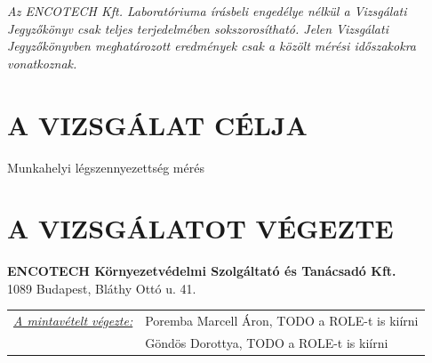 \documentclass[a4paper,12pt]{article}
\begin{document}
	\begin{center}
		{\scriptsize 
			\textit{
				Az ENCOTECH Kft. Laboratóriuma írásbeli engedélye nélkül a Vizsgálati Jegyzőkönyv csak teljes terjedelmében sokszorosítható. 
				Jelen Vizsgálati Jegyzőkönyvben meghatározott eredmények csak a közölt mérési időszakokra vonatkoznak.
		}}  
	\end{center}
	
	\newpage
	

	\tableofcontents
	

	\newpage  %
	\pagestyle{report}
	
	
	\section{A VIZSGÁLAT CÉLJA}
		\begin{adjustwidth}{1cm}{0cm}
		Munkahelyi légszennyezettség mérés
		\end{adjustwidth}
	
	
	\section{A VIZSGÁLATOT VÉGEZTE}
		\begin{adjustwidth}{1cm}{0cm}
			\noindent
			\textbf{ENCOTECH Környezetvédelmi Szolgáltató és Tanácsadó Kft.} \\
			1089 Budapest, Bláthy Ottó u. 41.
			
			\vspace{1.0em} %
			
			\noindent
			\begin{tabular}{ p{5.5cm} p{8cm} } 
				\textit{\underline{A mintavételt végezte:}} & Poremba Marcell Áron, TODO a ROLE-t is kiírni \\ & Göndös Dorottya, TODO a ROLE-t is kiírni \\ 
			\end{tabular}
		\end{adjustwidth}
	
\end{document}
